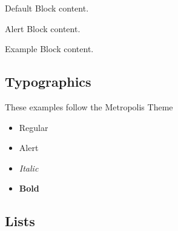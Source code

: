 \documentclass[
11pt,notheorems,hyperref={pdfauthor=Maghfira Ramadhani}
]{beamer}
\begin{document}
\begin{frame}

   \centering
	\begin{minipage}[b]{0.5\textwidth}

	  \begin{block}{Default}
        Block content.
      \end{block}

      \begin{alertblock}{Alert}
        Block content.
      \end{alertblock}

      \begin{exampleblock}{Example}
        Block content.
      \end{exampleblock}      
      
	\end{minipage}	
\end{frame}

\subsection{Typographics}
\begin{frame}
    These examples follow the Metropolis Theme
    \begin{itemize}
        \item Regular
        \item \alert{Alert}
        \item \textit{Italic}
        \item \textbf{Bold}
    \end{itemize}
\end{frame}

\subsection{Lists}
\end{document}
